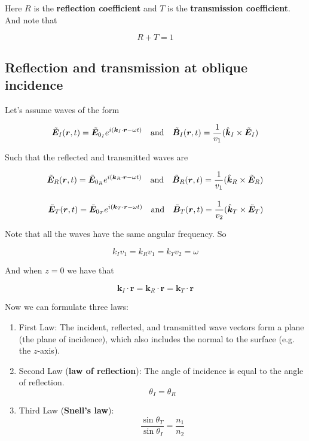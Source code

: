\documentclass[a4paper]{article}
\begin{document}
Here $R$ is the \textbf{reflection coefficient} and $T$ is the \textbf{transmission coefficient}. And note that

\begin{equation*}
    R+T=1
\end{equation*}

\subsection{Reflection and transmission at oblique incidence}

Let's assume waves of the form

\begin{align*}
    \Tilde{\bm{E}}_I(\bm{r}, t) = \Tilde{\bm{E}}_{0_{I}}e^{i(\bm{k}_I\cdot\bm{r}-\omega t)}\quad\text{and}\quad\Tilde{\bm{B}}_I(\bm{r}, t) = \frac{1}{v_1}(\hat{\bm{k}}_I\times\Tilde{\bm{E}}_I)
\end{align*}

Such that the reflected and transmitted waves are

\begin{align*}
    \Tilde{\bm{E}}_R(\bm{r}, t) = \Tilde{\bm{E}}_{0_{R}}e^{i(\bm{k}_R\cdot\bm{r}-\omega t)}\quad\text{and}\quad\Tilde{\bm{B}}_R(\bm{r}, t) = \frac{1}{v_1}(\hat{\bm{k}}_R\times\Tilde{\bm{E}}_R)\\[1em]
    \Tilde{\bm{E}}_T(\bm{r}, t) = \Tilde{\bm{E}}_{0_{T}}e^{i(\bm{k}_T\cdot\bm{r}-\omega t)}\quad\text{and}\quad\Tilde{\bm{B}}_T(\bm{r}, t) = \frac{1}{v_2}(\hat{\bm{k}}_T\times\Tilde{\bm{E}}_T)
\end{align*}

Note that all the waves have the same angular frequency. So

\begin{equation*}
    k_Iv_1=k_Rv_1=k_Tv_2=\omega
\end{equation*}

And when $z=0$ we have that

\begin{equation*}
    \bm{k}_I\cdot\bm{r}=\bm{k}_R\cdot\bm{r}=\bm{k}_T\cdot\bm{r}
\end{equation*}

Now we can formulate three laws:

\begin{enumerate}
    \item First Law: The incident, reflected, and transmitted wave vectors form a plane (the plane of incidence), which also includes the normal to the surface (e.g. the $z$-axis).
    \item Second Law (\textbf{law of reflection}): The angle of incidence is equal to the angle of reflection. $$\theta_I=\theta_R$$
    \item Third Law (\textbf{Snell's law}): $$\frac{\sin\theta_T}{\sin\theta_I}=\frac{n_1}{n_2}$$
\end{enumerate}
\end{document}
